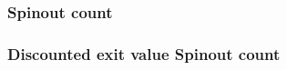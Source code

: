 \documentclass[12pt,english]{article}
\theoremstyle{remark}
\begin{document}
\subsubsection{Spinout count}


\linebreak



\subsubsection{Discounted exit value Spinout count}

\linebreak

\end{document}
